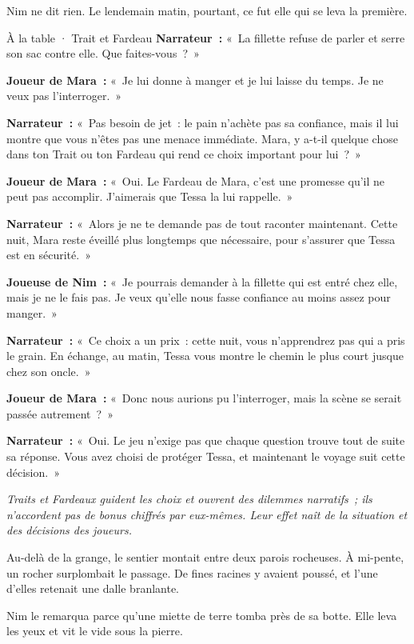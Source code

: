 \documentclass[10pt,a4paper]{article}
\begin{document}
Nim ne dit rien. Le lendemain matin, pourtant, ce fut elle qui se leva la première.
\begin{rpgexample}{À la table · Trait et Fardeau}
\textbf{Narrateur~:} «~La fillette refuse de parler et serre son sac contre elle. Que faites-vous~?~»

\textbf{Joueur de Mara~:} «~Je lui donne à manger et je lui laisse du temps. Je ne veux pas l’interroger.~»

\textbf{Narrateur~:} «~Pas besoin de jet~: le pain n’achète pas sa confiance, mais il lui montre que vous n’êtes pas une menace immédiate. Mara, y a-t-il quelque chose dans ton Trait ou ton Fardeau qui rend ce choix important pour lui~?~»

\textbf{Joueur de Mara~:} «~Oui. Le Fardeau de Mara, c’est une promesse qu’il ne peut pas accomplir. J’aimerais que Tessa la lui rappelle.~»

\textbf{Narrateur~:} «~Alors je ne te demande pas de tout raconter maintenant. Cette nuit, Mara reste éveillé plus longtemps que nécessaire, pour s’assurer que Tessa est en sécurité.~»

\textbf{Joueuse de Nim~:} «~Je pourrais demander à la fillette qui est entré chez elle, mais je ne le fais pas. Je veux qu’elle nous fasse confiance au moins assez pour manger.~»

\textbf{Narrateur~:} «~Ce choix a un prix~: cette nuit, vous n’apprendrez pas qui a pris le grain. En échange, au matin, Tessa vous montre le chemin le plus court jusque chez son oncle.~»

\textbf{Joueur de Mara~:} «~Donc nous aurions pu l’interroger, mais la scène se serait passée autrement~?~»

\textbf{Narrateur~:} «~Oui. Le jeu n’exige pas que chaque question trouve tout de suite sa réponse. Vous avez choisi de protéger Tessa, et maintenant le voyage suit cette décision.~»

\emph{Traits et Fardeaux guident les choix et ouvrent des dilemmes narratifs~; ils n’accordent pas de bonus chiffrés par eux-mêmes. Leur effet naît de la situation et des décisions des joueurs.}

\end{rpgexample}
Au-delà de la grange, le sentier montait entre deux parois rocheuses. À mi-pente, un rocher surplombait le passage. De fines racines y avaient poussé, et l’une d’elles retenait une dalle branlante.

Nim le remarqua parce qu’une miette de terre tomba près de sa botte. Elle leva les yeux et vit le vide sous la pierre.
\end{document}
